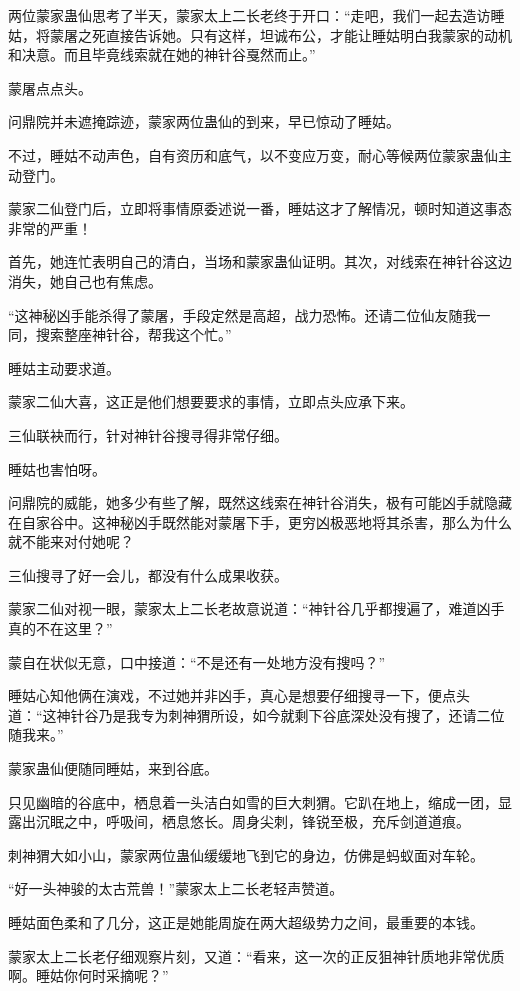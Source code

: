 \begin{this_body}
两位蒙家蛊仙思考了半天，蒙家太上二长老终于开口：“走吧，我们一起去造访睡姑，将蒙屠之死直接告诉她。只有这样，坦诚布公，才能让睡姑明白我蒙家的动机和决意。而且毕竟线索就在她的神针谷戛然而止。”

蒙屠点点头。

问鼎院并未遮掩踪迹，蒙家两位蛊仙的到来，早已惊动了睡姑。

不过，睡姑不动声色，自有资历和底气，以不变应万变，耐心等候两位蒙家蛊仙主动登门。

蒙家二仙登门后，立即将事情原委述说一番，睡姑这才了解情况，顿时知道这事态非常的严重！

首先，她连忙表明自己的清白，当场和蒙家蛊仙证明。其次，对线索在神针谷这边消失，她自己也有焦虑。

“这神秘凶手能杀得了蒙屠，手段定然是高超，战力恐怖。还请二位仙友随我一同，搜索整座神针谷，帮我这个忙。”

睡姑主动要求道。

蒙家二仙大喜，这正是他们想要要求的事情，立即点头应承下来。

三仙联袂而行，针对神针谷搜寻得非常仔细。

睡姑也害怕呀。

问鼎院的威能，她多少有些了解，既然这线索在神针谷消失，极有可能凶手就隐藏在自家谷中。这神秘凶手既然能对蒙屠下手，更穷凶极恶地将其杀害，那么为什么就不能来对付她呢？

三仙搜寻了好一会儿，都没有什么成果收获。

蒙家二仙对视一眼，蒙家太上二长老故意说道：“神针谷几乎都搜遍了，难道凶手真的不在这里？”

蒙自在状似无意，口中接道：“不是还有一处地方没有搜吗？”

睡姑心知他俩在演戏，不过她并非凶手，真心是想要仔细搜寻一下，便点头道：“这神针谷乃是我专为刺神猬所设，如今就剩下谷底深处没有搜了，还请二位随我来。”

蒙家蛊仙便随同睡姑，来到谷底。

只见幽暗的谷底中，栖息着一头洁白如雪的巨大刺猬。它趴在地上，缩成一团，显露出沉眠之中，呼吸间，栖息悠长。周身尖刺，锋锐至极，充斥剑道道痕。

刺神猬大如小山，蒙家两位蛊仙缓缓地飞到它的身边，仿佛是蚂蚁面对车轮。

“好一头神骏的太古荒兽！”蒙家太上二长老轻声赞道。

睡姑面色柔和了几分，这正是她能周旋在两大超级势力之间，最重要的本钱。

蒙家太上二长老仔细观察片刻，又道：“看来，这一次的正反狙神针质地非常优质啊。睡姑你何时采摘呢？”


\end{this_body}
